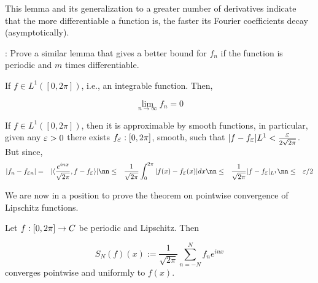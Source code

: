 This lemma and its generalization to a greater number of derivatives indicate that the more differentiable a function is, the faster its Fourier coefficients decay (asymptotically).

\ejer: Prove a similar lemma that gives a better bound for $f_n$ if the function is periodic and $m$ times differentiable.

 If $f \in L^1([0,2\pi])$, i.e., an integrable function. Then,

\begin{equation} \label{eq:R_L} \lim_{n \to \infty} f_n = 0 \end{equation} \elem

\bpru If $f\in L^1([0,2\pi])$, then it is approximable by smooth functions, in particular, given any $\mbox{$\varepsilon$} >0$ there exists $f_{\mbox{$\varepsilon$}}:[0,2\pi]$, smooth, such that $|f-f_{\mbox{$\varepsilon$}}|{L^1} < \frac{\mbox{$\varepsilon$}}{2\sqrt{2\pi}}$. But since, \begin{eqnarray} |f_n - f_{\eps n}| &=& |\langle \frac{e^{inx}}{\sqrt{2\pi}},f - f_{\eps} \rangle | \nn &\leq& \frac{1}{\sqrt{2\pi}} \int_0^{2\pi}|f(x) - f_{\eps}(x)|dx \nn &\leq& \frac{1}{\sqrt{2\pi}}|f-f_{\eps}|_{L^1} \nn &\leq& \eps/2 \end{eqnarray} %

We are now in a position to prove the theorem on pointwise convergence of Lipschitz functions.

\bteo Let $f:[0,2\pi] \to C$ be periodic and Lipschitz. Then

\begin{equation} S_N(f)(x) := \frac{1}{\sqrt{2\pi}}\sum_{n=-N}^{N} f_n e^{inx}
\end{equation} converges pointwise and uniformly to $f(x)$. \eteo

